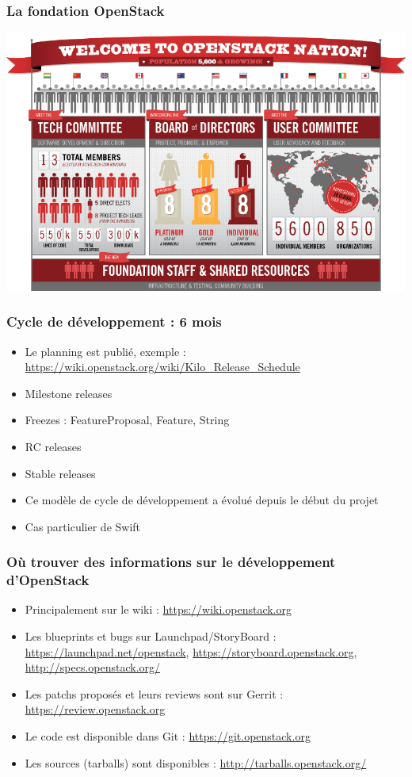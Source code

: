   \begin{frame}
    \frametitle{La fondation OpenStack}
      \includegraphics[width=\textwidth]{images/foundation.png}
  \end{frame}

  \begin{frame}
    \frametitle{Cycle de développement : 6 mois}
    \begin{itemize}
      \item Le planning est publié, exemple : \url{https://wiki.openstack.org/wiki/Kilo_Release_Schedule}
      \item Milestone releases
      \item Freezes : FeatureProposal, Feature, String
      \item RC releases
      \item Stable releases
      \item Ce modèle de cycle de développement a évolué depuis le début du projet
      \item Cas particulier de Swift
    \end{itemize}
  \end{frame}

  \begin{frame}
    \frametitle{Où trouver des informations sur le développement d'OpenStack}
    \begin{itemize}
      \item Principalement sur le wiki : \url{https://wiki.openstack.org}
      \item Les blueprints et bugs sur Launchpad/StoryBoard : \url{https://launchpad.net/openstack}, \url{https://storyboard.openstack.org}, \url{http://specs.openstack.org/}
      \item Les patchs proposés et leurs reviews sont sur Gerrit : \url{https://review.openstack.org}
      \item Le code est disponible dans Git : \url{https://git.openstack.org}
      \item Les sources (tarballs) sont disponibles : \url{http://tarballs.openstack.org/}
    \end{itemize}
  \end{frame}

